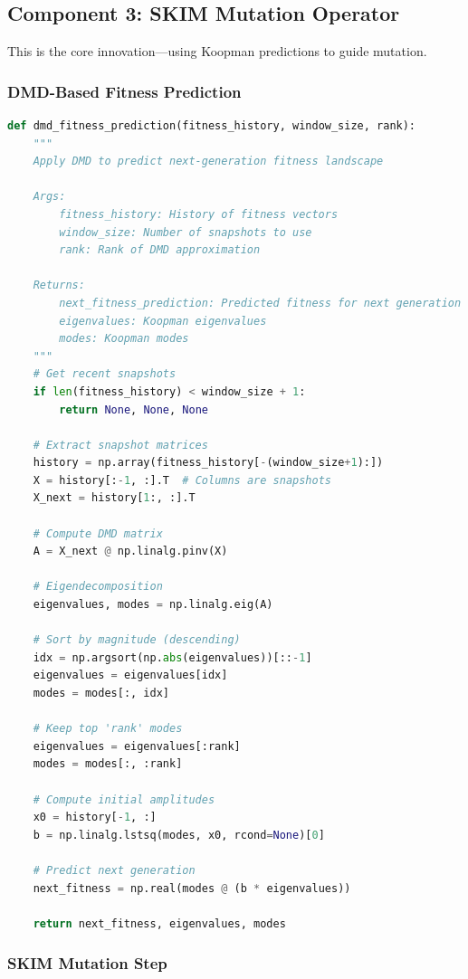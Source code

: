 \documentclass[12pt,a4paper]{article}
\begin{document}
\subsection{Component 3: SKIM Mutation Operator}

This is the core innovation---using Koopman predictions to guide mutation.

\subsubsection{DMD-Based Fitness Prediction}

\begin{lstlisting}[language=Python, caption=DMD-Based Fitness Prediction]
def dmd_fitness_prediction(fitness_history, window_size, rank):
    """
    Apply DMD to predict next-generation fitness landscape
    
    Args:
        fitness_history: History of fitness vectors
        window_size: Number of snapshots to use
        rank: Rank of DMD approximation
    
    Returns:
        next_fitness_prediction: Predicted fitness for next generation
        eigenvalues: Koopman eigenvalues
        modes: Koopman modes
    """
    # Get recent snapshots
    if len(fitness_history) < window_size + 1:
        return None, None, None
    
    # Extract snapshot matrices
    history = np.array(fitness_history[-(window_size+1):])
    X = history[:-1, :].T  # Columns are snapshots
    X_next = history[1:, :].T
    
    # Compute DMD matrix
    A = X_next @ np.linalg.pinv(X)
    
    # Eigendecomposition
    eigenvalues, modes = np.linalg.eig(A)
    
    # Sort by magnitude (descending)
    idx = np.argsort(np.abs(eigenvalues))[::-1]
    eigenvalues = eigenvalues[idx]
    modes = modes[:, idx]
    
    # Keep top 'rank' modes
    eigenvalues = eigenvalues[:rank]
    modes = modes[:, :rank]
    
    # Compute initial amplitudes
    x0 = history[-1, :]
    b = np.linalg.lstsq(modes, x0, rcond=None)[0]
    
    # Predict next generation
    next_fitness = np.real(modes @ (b * eigenvalues))
    
    return next_fitness, eigenvalues, modes
\end{lstlisting}

\subsubsection{SKIM Mutation Step}
\end{document}
